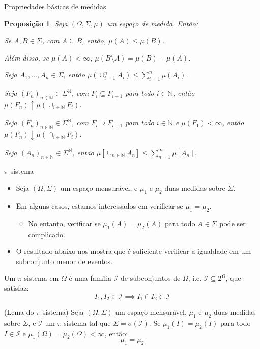 \documentclass[11pt]{beamer}
\newenvironment{wideenumerate}{\enumerate\addtolength{\itemsep}{10pt}}{\endenumerate}
\newenvironment{halfwideitemize}{\itemize\addtolength{\itemsep}{0.5em}}{\enditemize}
\newtheorem{proposition}{Proposição}
\begin{document}
\begin{frame}{Propriedades básicas de medidas}
\begin{proposition}
	Seja $(\Omega, \Sigma, \mu)$ um espaço de medida. Então:
	\begin{wideenumerate}
		\item Se $A, B \in \Sigma$, com $A \subseteq B$, então, $\mu(A)\leq \mu(B)$.
		\begin{halfwideitemize}
			\item Além disso, se $\mu(A)<\infty$, $\mu(B\setminus A) = \mu(B) - \mu(A)$.
		\end{halfwideitemize}
		\item Seja $A_1, \ldots, A_n \in \Sigma$, então $\mu(\cup_{i=1}^n A_i)\leq \sum_{i=1}^n \mu(A_i) $.
		\item Seja $(F_n)_{n\in \mathbb{N}} \in \Sigma^{\mathbb{N}}$, com $F_i \subseteq F_{i+1}$ para todo $i\in \mathbb{N}$, então $\mu(F_n) \uparrow \mu(\cup_{i \in \mathbb{N}} F_i)$.
				\item Seja $(F_n)_{n\in \mathbb{N}} \in \Sigma^{\mathbb{N}}$, com $F_i \supseteq F_{i+1}$ para todo $i\in \mathbb{N}$ e {\color{blue}$\mu(F_1)<\infty$}, então $\mu(F_n) \downarrow \mu(\cap_{i \in \mathbb{N}} F_i)$.
		\item Seja $(A_n)_{n\in \mathbb{N}} \in \Sigma^{\mathbb{N}}$, então $\mathbb{\mu}[\cup_{n \in \mathbb{N}}A_n] \leq \sum_{n=1}^\infty  \mathbb{\mu}[A_n]$.
	\end{wideenumerate}
	\end{proposition}
\end{frame}

\begin{frame}{$\pi$-sistema}
\begin{itemize}
	\item Seja $(\Omega, \Sigma)$ um espaço mensurável, e $\mu_1$ e $\mu_2$ duas medidas sobre $\Sigma$.
	\item Em alguns casos, estamos interessados em verificar se $\mu_1 = \mu_2$.
	\begin{itemize}
		\item No entanto, verificar se $\mu_1(A) = \mu_2(A)$ para todo $A \in \Sigma$ pode ser complicado.
	\end{itemize}
	\item O resultado abaixo nos mostra que é suficiente verificar a igualdade em um subconjunto menor de eventos.
\end{itemize}
	\begin{definition}
		Um $\pi$-sistema em $\Omega$ é uma família $\mathcal{I}$ de subconjuntos de $\Omega$, i.e. $\mathcal{I}\subseteq 2^\Omega$, que satisfaz:
		$$I_1, I_2 \in \mathcal{I} \implies I_1 \cap I_2 \in \mathcal{I}$$
	\end{definition}
	\begin{lemma}
		(Lema do $\pi$-sistema) Seja $(\Omega, \Sigma)$ um espaço mensurável, $\mu_1$ e $\mu_2$ duas medidas sobre $\Sigma$, e $\mathcal{I}$ um $\pi$-sistema tal que $\Sigma = \sigma(\mathcal{I})$. Se $\mu_1(I) = \mu_2(I)$ para todo $I \in \mathcal{I}$ e $\mu_1(\Omega) = \mu_2(\Omega) < \infty$, então:
		$$\mu_1 = \mu_2$$
	\end{lemma}

\end{frame}
\end{document}
